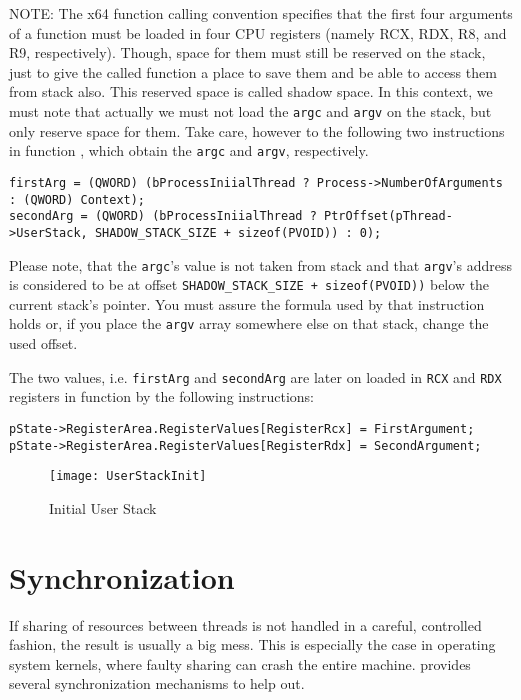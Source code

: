\begin{appendices}
NOTE: The x64 function calling convention \cite{x64-calling-convention} specifies that the first four arguments of a function must be loaded in four CPU registers (namely RCX, RDX, R8, and R9, respectively). Though, space for them must still be reserved on the stack, just to give the called function a place to save them and be able to access them from stack also. This reserved space is called shadow space. In this context, we must note that actually we must not load the \texttt{argc} and \texttt{argv} on the stack, but only reserve space for them. Take care, however to the following two instructions in function , which  obtain the \texttt{argc} and \texttt{argv}, respectively. 

\begin{lstlisting}
firstArg = (QWORD) (bProcessIniialThread ? Process->NumberOfArguments : (QWORD) Context);
secondArg = (QWORD) (bProcessIniialThread ? PtrOffset(pThread->UserStack, SHADOW_STACK_SIZE + sizeof(PVOID)) : 0);
\end{lstlisting}

Please note, that the \texttt{argc}'s value is not taken from stack and that \texttt{argv}'s address is considered to be at offset \texttt{SHADOW\_STACK\_SIZE + sizeof(PVOID))} below the current stack's pointer. You must assure the formula used by that instruction holds or, if you place the \texttt{argv} array somewhere else on that stack, change the used offset. 

The two values, i.e. \texttt{firstArg} and \texttt{secondArg} are later on loaded in \texttt{RCX} and \texttt{RDX} registers in function  by the following instructions:
\begin{lstlisting}
pState->RegisterArea.RegisterValues[RegisterRcx] = FirstArgument;
pState->RegisterArea.RegisterValues[RegisterRdx] = SecondArgument;
\end{lstlisting}

\begin{figure}
	\centering
	\texttt{[image: UserStackInit]}
		\caption{Initial User Stack}
	\label{fig:UserStackInit}
\end{figure}

\section{Synchronization}
\label{sect:Synch}

If sharing of resources between threads is not handled in a careful, controlled fashion, the result
is usually a big mess. This is especially the case in operating system kernels, where faulty sharing
can crash the entire machine. \projectname provides several synchronization mechanisms to help out.


\end{appendices}
